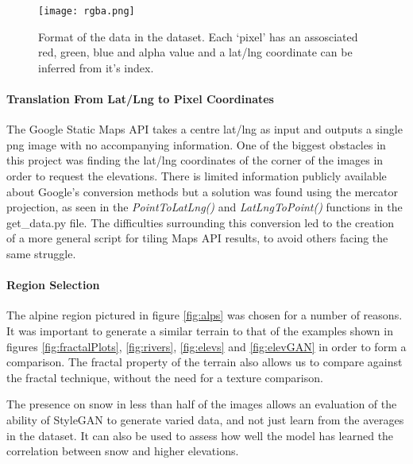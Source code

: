 \documentclass[a4paper]{report}
\begin{document}
\begin{figure}[H]
    \centering
        \texttt{[image: rgba.png]}
        \caption{Format of the data in the dataset. Each `pixel' has an assosciated red, green, blue and alpha value and a lat/lng coordinate can be inferred from it's index.}
        \label{fig:rgba}
\end{figure}

\paragraph{Translation From Lat/Lng to Pixel Coordinates}
The Google Static Maps API takes a centre lat/lng as input and outputs a single png image with no accompanying information. One of the biggest obstacles in this project was finding the lat/lng coordinates of the corner of the images in order to request the elevations. There is limited information publicly available about Google's conversion methods but a solution was found using the mercator projection, as seen in the \textit{PointToLatLng()} and \textit{LatLngToPoint()} functions in the get\_data.py file.
The difficulties surrounding this conversion led to the creation of a more general script \cite{ToDo} for tiling Maps API results, to avoid others facing the same struggle.

\paragraph{Region Selection}
The alpine region pictured in figure \ref{fig:alps} was chosen for a number of reasons. It was important to generate a similar terrain to that of the examples shown in figures \ref{fig:fractalPlots}, \ref{fig:rivers}, \ref{fig:elevs} and \ref{fig:elevGAN} in order to form a comparison. The fractal property of the terrain also allows us to compare against the fractal technique, without the need for a texture comparison.

The presence on snow in less than half of the images allows an evaluation of the ability of StyleGAN to generate varied data, and not just learn from the averages in the dataset. It can also be used to assess how well the model has learned the correlation between snow and higher elevations.
\end{document}
